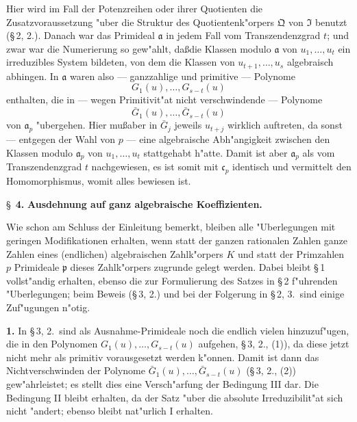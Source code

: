 \documentclass[12pt,a4paper]{article}
\theoremstyle{plain}
\begin{document}
Hier wird im Fall der Potenzreihen oder ihrer Quotienten die Zusatzvoraussetzung "uber die Struktur des Quotientenk"orpers $\mathfrak{Q}$ von $\mathfrak{I}$ benutzt (\S\,2, 2.). Danach war das Primideal $\mathfrak{a}$ in jedem Fall vom Transzendenzgrad $t$; und zwar war die Numerierung so gew"ahlt, da\ss die Klassen modulo $\mathfrak{a}$ von $u_1,\ldots,u_t$ ein irreduzibles System bildeten, von dem die Klassen von $u_{t+1},\ldots,u_s$ algebraisch abhingen. In $\mathfrak{a}$ waren also --- ganzzahlige und primitive --- Polynome
\[
G_1(u),\ldots,G_{s-t}(u)\tag{1}
\]
enthalten, die in --- wegen Primitivit"at nicht verschwindende --- Polynome
\[
\bar{G}_1(u),\ldots,\bar{G}_{s-t}(u)\tag{2}
\]
von $\mathfrak{a}_p$ "ubergehen. Hier mu\ss aber in $\bar{G}_j$ jeweils $u_{t+j}$ wirklich auftreten, da sonst --- entgegen der Wahl von $p$ --- eine algebraische Abh"angigkeit zwischen den Klassen modulo $\mathfrak{a}_p$ von $u_1,\ldots,u_t$ stattgehabt h"atte. Damit ist aber $\mathfrak{a}_p$ als vom Transzendenzgrad $t$ nachgewiesen, es ist somit mit $\mathfrak{c}_p$ identisch und vermittelt den Homomorphismus, womit alles bewiesen ist.

\newpage
\S~\textbf{4.}
\textbf{Ausdehnung auf ganz algebraische Koeffizienten.}

\smallskip

\noindent
Wie schon am Schluss der Einleitung bemerkt, bleiben alle "Uberlegungen mit geringen Modifikationen erhalten, wenn statt der ganzen rationalen Zahlen ganze Zahlen eines (endlichen) algebraischen Zahlk"orpers $K$ und statt der Primzahlen $p$ Primideale $\mathfrak{p}$ dieses Zahlk"orpers zugrunde gelegt werden. Dabei bleibt \S\,1 vollst"andig erhalten, ebenso die zur Formulierung des Satzes in \S\,2 f"uhrenden "Uberlegungen; beim Beweis (\S\,3, 2.) und bei der Folgerung in \S\,2, 3.\ sind einige Zuf"ugungen n"otig.

\medskip\noindent\textbf{1.}
In \S\,3, 2.\ sind als Ausnahme-Primideale noch die endlich vielen hinzuzuf"ugen, die in den Polynomen $G_1(u),\ldots,G_{s-t}(u)$ aufgehen, \S\,3, 2., (1)), da diese jetzt nicht mehr als primitiv vorausgesetzt werden k"onnen. Damit ist dann das Nichtverschwinden der Polynome $\bar{G}_1(u),\ldots,\bar{G}_{s-t}(u)$ (\S\,3, 2., (2)) gew"ahrleistet; es stellt dies eine Versch"arfung der Bedingung III dar. Die Bedingung II bleibt erhalten, da der Satz "uber die absolute Irreduzibilit"at sich nicht "andert; ebenso bleibt nat"urlich I erhalten.
\end{document}
